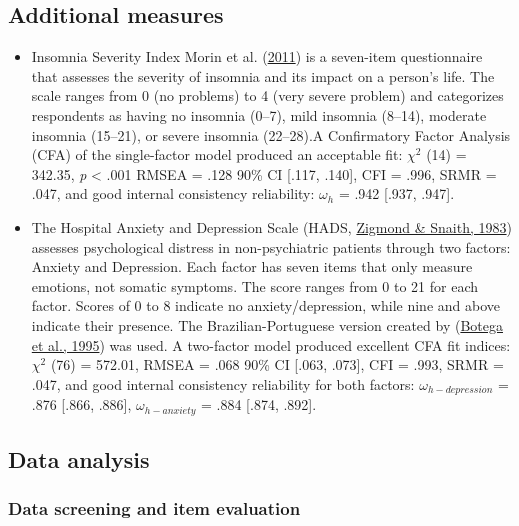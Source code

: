 \documentclass[
  ,doc,11pt, twoside,floatsintext]{apa6}
\begin{document}
\hypertarget{additional-measures}{%
\subsection{Additional measures}\label{additional-measures}}

\begin{itemize}
\item
  Insomnia Severity Index Morin et al. (\protect\hyperlink{ref-morin2011a}{2011}) is a seven-item questionnaire that assesses the severity of insomnia and its impact on a person's life. The scale ranges from 0 (no problems) to 4 (very severe problem) and categorizes respondents as having no insomnia (0--7), mild insomnia (8--14), moderate insomnia (15--21), or severe insomnia (22--28).A Confirmatory Factor Analysis (CFA) of the single-factor model produced an acceptable fit: \(\chi^2\) (14) = 342.35, \emph{p} \textless{} .001 RMSEA = .128 90\% CI {[}.117, .140{]}, CFI = .996, SRMR = .047, and good internal consistency reliability: \(\omega_h\) = .942 {[}.937, .947{]}.
\item
  The Hospital Anxiety and Depression Scale (HADS, \protect\hyperlink{ref-zigmond1983hospital}{Zigmond \& Snaith, 1983}) assesses psychological distress in non-psychiatric patients through two factors: Anxiety and Depression. Each factor has seven items that only measure emotions, not somatic symptoms. The score ranges from 0 to 21 for each factor. Scores of 0 to 8 indicate no anxiety/depression, while nine and above indicate their presence. The Brazilian-Portuguese version created by (\protect\hyperlink{ref-botega1995transtornos}{Botega et al., 1995}) was used. A two-factor model produced excellent CFA fit indices: \(\chi^2\) (76) = 572.01, RMSEA = .068 90\% CI {[}.063, .073{]}, CFI = .993, SRMR = .047, and good internal consistency reliability for both factors: \(\omega_{h-depression}\) = .876 {[}.866, .886{]}, \(\omega_{h-anxiety}\) = .884 {[}.874, .892{]}.
\end{itemize}

\hypertarget{data-analysis}{%
\subsection{Data analysis}\label{data-analysis}}

\hypertarget{data-screening-and-item-evaluation}{%
\subsubsection{Data screening and item evaluation}\label{data-screening-and-item-evaluation}}
\end{document}
